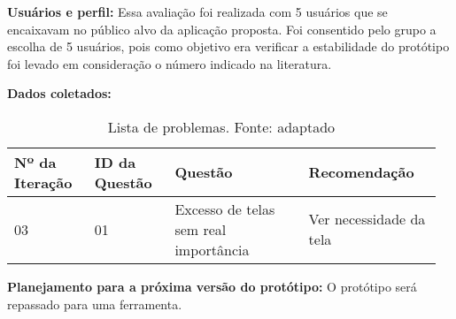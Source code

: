 \textbf{Usuários e perfil:}
Essa avaliação foi realizada com 5 usuários que se encaixavam no público alvo da aplicação proposta. 
Foi consentido pelo grupo a escolha de 5 usuários, pois como objetivo era verificar a estabilidade
do protótipo foi levado em consideração o número indicado na literatura.

\textbf{Dados coletados:}

\begin{table*}[!h]
\caption{Lista de problemas. Fonte: \cite{preece} adaptado}
\label{tab:problema}
  \begin{tabular}{p{0.18\linewidth}p{0.18\linewidth}p{0.30\linewidth}p{0.30\linewidth}}
  \hline
    Nº da Iteração & ID da Questão & Questão & Recomendação\\
 \hline
    03 & 01 & Excesso de telas sem real importância & Ver necessidade da tela\\
  \end{tabular}
\end{table*}

\textbf{Planejamento para a próxima versão do protótipo:}
O protótipo será repassado para uma ferramenta.
 